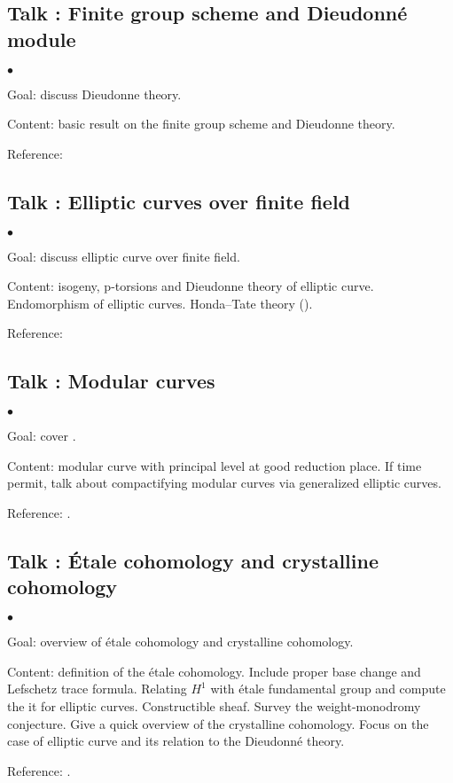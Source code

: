 \documentclass[a4paper, reqno]{amsart} %
\theoremstyle{definition}
\numberwithin{equation}{section}
\newenvironment{altitemize}
	{\begin{list}
			{$\bullet$}
			{\setlength{\labelwidth}{0pt}
				\setlength{\itemindent}{5pt}
				\setlength{\labelsep}{5pt}
				\setlength{\leftmargin}{0pt}
				\setlength{\itemsep}{\the\smallskipamount}
		}}
		{\end{list}}
\begin{document}
\subsection{Talk : Finite group scheme and Dieudonn\'e module}
\begin{altitemize}
\item[Goal:] discuss Dieudonne theory.
\item[Content:] basic result on the finite group scheme and Dieudonne theory.
\item[Reference:]
\end{altitemize}

\subsection{Talk : Elliptic curves over finite field}
\begin{altitemize}
\item[Goal:] discuss elliptic curve over finite field.
\item[Content:] isogeny, p-torsions and Dieudonne theory of elliptic curve. Endomorphism of elliptic curves. Honda–Tate theory (\cite[Theorem 10.4]{Scholze-MC}).
\item[Reference:]
\end{altitemize}


\subsection{Talk : Modular curves}
\begin{altitemize}
\item[Goal:] cover \cite[\S 4]{Scholze-MC}.
\item[Content:] modular curve with principal level at good reduction place. If time permit, talk about compactifying modular curves via generalized elliptic curves.
\item[Reference:] \cite{Deligne-Rapoport}.
\end{altitemize}



\subsection{Talk : \'Etale cohomology and crystalline cohomology}
\begin{altitemize}
\item[Goal:] overview of \'etale cohomology and crystalline cohomology.
\item[Content:] definition of the \'etale cohomology. Include proper base change and Lefschetz trace formula. Relating $H^1$ with \'etale fundamental group and compute the it for elliptic curves. Constructible sheaf. 
Survey the weight-monodromy conjecture. Give a quick overview of the crystalline cohomology. Focus on the case of elliptic curve and its relation to the Dieudonn\'e theory.
\item[Reference:] \cite{Deligne-Rapoport}.
\end{altitemize}
\end{document}
